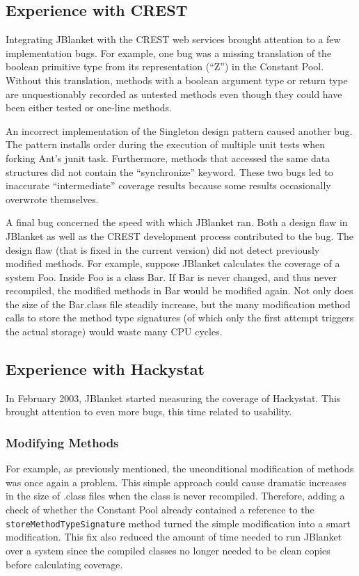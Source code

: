 \subsection{Experience with CREST}
Integrating JBlanket with the CREST web services brought attention to a few
implementation bugs.  For example, one bug was a missing translation of the
boolean primitive type from its representation (``Z'') in the Constant
Pool.  Without this translation, methods with a boolean argument type or
return type are unquestionably recorded as untested methods even though
they could have been either tested or one-line methods.

An incorrect implementation of the Singleton design pattern caused another
bug.  The pattern installs order during the execution of multiple unit
tests when forking Ant's junit task.  Furthermore, methods that accessed
the same data structures did not contain the ``synchronize'' keyword.
These two bugs led to inaccurate ``intermediate'' coverage results because
some results occasionally overwrote themselves.

A final bug concerned the speed with which JBlanket ran.  Both a design
flaw in JBlanket as well as the CREST development process contributed to
the bug.  The design flaw (that is fixed in the current version) did not
detect previously modified methods.  For example, suppose JBlanket
calculates the coverage of a system Foo.  Inside Foo is a class Bar.  If
Bar is never changed, and thus never recompiled, the modified methods in
Bar would be modified again.  Not only does the size of the Bar.class file
steadily increase, but the many modification method calls to store the
method type signatures (of which only the first attempt triggers the actual
storage) would waste many CPU cycles.

\subsection{Experience with Hackystat}
In February 2003, JBlanket started measuring the coverage of Hackystat.
This brought attention to even more bugs, this time related to usability.

\subsubsection{Modifying Methods}
For example, as previously mentioned, the unconditional modification of
methods was once again a problem.  This simple approach could cause
dramatic increases in the size of .class files when the class is never
recompiled.  Therefore, adding a check of whether the Constant Pool already
contained a reference to the {\tt storeMethodTypeSignature} method turned
the simple modification into a smart modification.  This fix also reduced
the amount of time needed to run JBlanket over a system since the compiled
classes no longer needed to be clean copies before calculating coverage.


